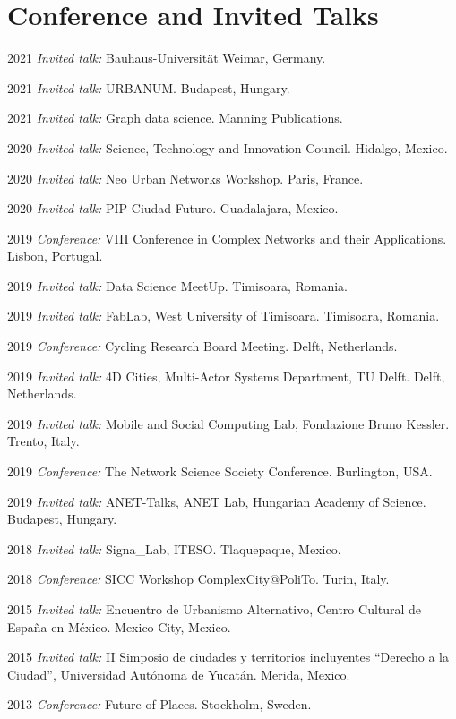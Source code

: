 \documentclass{academiccv}
\begin{document}
\section*{Conference and Invited Talks}
\begin{tablist}
	\item[2021] \tab \textit{Invited talk:} Bauhaus-Universität Weimar, Germany. 
	\item[2021] \tab \textit{Invited talk:} URBANUM. Budapest, Hungary.
	\item[2021] \tab \textit{Invited talk:} Graph data science. Manning Publications.
	\item[2020] \tab \textit{Invited talk:} Science, Technology and Innovation Council. Hidalgo, Mexico.
	\item[2020] \tab \textit{Invited talk:} Neo Urban Networks Workshop. Paris, France.
	\item[2020] \tab \textit{Invited talk:} PIP Ciudad Futuro. Guadalajara, Mexico.
	\item[2019] \tab \textit{Conference:} VIII Conference in Complex Networks and their Applications. Lisbon, Portugal.
	\item[2019] \tab \textit{Invited talk:} Data Science MeetUp. Timisoara, Romania.
	\item[2019] \tab \textit{Invited talk:} FabLab, West University of Timisoara. Timisoara, Romania.
	\item[2019] \tab \textit{Conference:} Cycling Research Board Meeting. Delft, Netherlands.
	\item[2019] \tab \textit{Invited talk:} 4D Cities, Multi-Actor Systems Department, TU Delft. Delft, Netherlands.
	\item[2019] \tab \textit{Invited talk:} Mobile and Social Computing Lab, Fondazione Bruno Kessler. Trento, Italy.
	\item[2019] \tab \textit{Conference:} The Network Science Society Conference. Burlington, USA.
	\item[2019] \tab \textit{Invited talk:} ANET-Talks, ANET Lab, Hungarian Academy of Science. Budapest, Hungary.
	\item[2018] \tab \textit{Invited talk:} Signa\_Lab, ITESO. Tlaquepaque, Mexico.
	\item[2018] \tab \textit{Conference:} SICC Workshop ComplexCity@PoliTo. Turin, Italy. 
	\item[2015] \tab \textit{Invited talk:} Encuentro de Urbanismo Alternativo, Centro Cultural de España en México. Mexico City, Mexico.
	\item[2015] \tab \textit{Invited talk:} II Simposio de ciudades y territorios incluyentes \enquote{Derecho a la Ciudad}, Universidad Autónoma de Yucatán. Merida, Mexico.
	\item[2013] \tab \textit{Conference:} Future of Places. Stockholm, Sweden.
\end{tablist}
\end{document}

